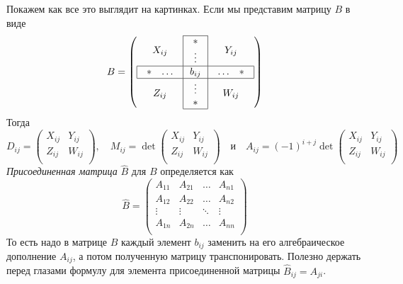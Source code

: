 Покажем как все это выглядит на картинках.
Если мы представим матрицу $B$ в виде
\[
B =
\left(
\begin{array}{c|c|c}
\cline{2-2}
{X_{ij}}&{
\begin{array}{c}
{*}\\{\vdots}
\end{array}
}&{Y_{ij}}\\
\hline
\multicolumn{1}{|c|}{
\begin{array}{cc}
{*}&{\ldots}
\end{array}
}&{b_{ij}}&\multicolumn{1}{c|}{
\begin{array}{cc}
{\ldots}&{*}
\end{array}
}\\
\hline
{Z_{ij}}&{
\begin{array}{c}
{\vdots}\\{*}
\end{array}
}&{W_{ij}}\\
\cline{2-2}
\end{array}
\right)
\]
Тогда
\[
D_{ij} =
\begin{pmatrix}
{X_{ij}}&{Y_{ij}}\\
{Z_{ij}}&{W_{ij}}\\
\end{pmatrix},\quad
M_{ij} = 
\det
\begin{pmatrix}
{X_{ij}}&{Y_{ij}}\\
{Z_{ij}}&{W_{ij}}\\
\end{pmatrix}\quad\text{и}\quad
A_{ij} =
(-1)^{i+j}
\det
\begin{pmatrix}
{X_{ij}}&{Y_{ij}}\\
{Z_{ij}}&{W_{ij}}\\
\end{pmatrix}
\]
{\it Присоединенная матрица} $\hat B$ для $B$ определяется как
\[
\hat B = 
\begin{pmatrix}
{A_{11}}&{A_{21}}&{\ldots}&{A_{n1}}\\
{A_{12}}&{A_{22}}&{\ldots}&{A_{n2}}\\
{\vdots}&{\vdots}&{\ddots}&{\vdots}\\
{A_{1n}}&{A_{2n}}&{\ldots}&{A_{nn}}\\
\end{pmatrix}
\]
То есть надо в матрице $B$ каждый элемент $b_{ij}$ заменить на его алгебраическое дополнение $A_{ij}$, а потом полученную матрицу транспонировать.
Полезно держать перед глазами формулу для элемента присоединенной матрицы $\hat B_{ij} = A_{ji}$.

